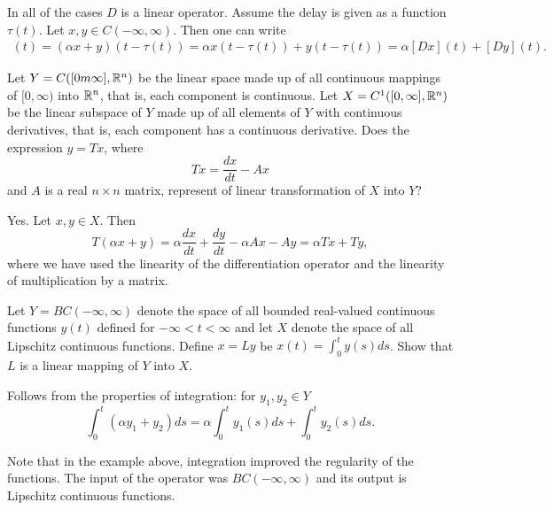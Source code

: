 \begin{solution}
	In all of the cases $ D $ is a linear operator. Assume the delay is given as a function $ \tau(t) $. Let $ x,y\in C(-\infty,\infty) $. Then one can write
	\begin{align*}
		[D(\alpha x +y)](t) = (\alpha x + y)(t-\tau(t)) = \alpha x(t-\tau(t)) + y(t-\tau(t)) = \alpha [Dx](t) + [Dy](t).
	\end{align*}
\end{solution}



\begin{problem}
	Let $ Y = C([0m\infty],\mathbb{R}^n) $ be the linear space made up of all continuous mappings of $ [0,\infty) $ into $ \mathbb{R}^n $, that is, each component is continuous. Let $ X = C^1([0,\infty],\mathbb{R}^n) $ be the linear subspace of $ Y $ made up of all elements of $ Y $ with continuous derivatives, that is, each component has a continuous derivative. Does the expression $ y = Tx $, where
	\[ Tx = \frac{dx}{dt} - Ax \]
	and $ A $ is a real $ n\times n $ matrix, represent of linear transformation of $ X $ into $ Y $?
\end{problem}

\begin{solution}
	Yes. Let $ x,y\in X $. Then
	\[ T(\alpha x + y) = \alpha \frac{dx}{dt} + \frac{dy}{dt} - \alpha Ax - Ay=  \alpha Tx + Ty, \]
	where we have used the linearity of the differentiation operator and the linearity of multiplication by a matrix.
\end{solution}

\begin{problem}
	Let $ Y = BC(-\infty,\infty) $ denote the space of all bounded real-valued continuous functions $ y(t) $ defined for $ -\infty < t < \infty $ and let $ X $ denote the space of all Lipschitz continuous functions. Define $ x = Ly $ be $ x(t) = \int_{0}^{t}y(s)ds $. Show that $ L $ is a linear mapping of $ Y $ into $ X $.
\end{problem}
\begin{solution}
	Follows from the properties of integration: for $ y_1,y_2 \in Y $
	\[ \int_{0}^{t}(\alpha y_1+y_2)ds = \alpha \int_{0}^{t}y_1(s)ds + \int_{0}^{t}y_2(s)ds. \]
\end{solution}

\begin{remark}
	Note that in the example above, integration improved the regularity of the functions. The input of the operator was $ BC(-\infty,\infty) $ and its output is Lipschitz continuous functions.
\end{remark}



